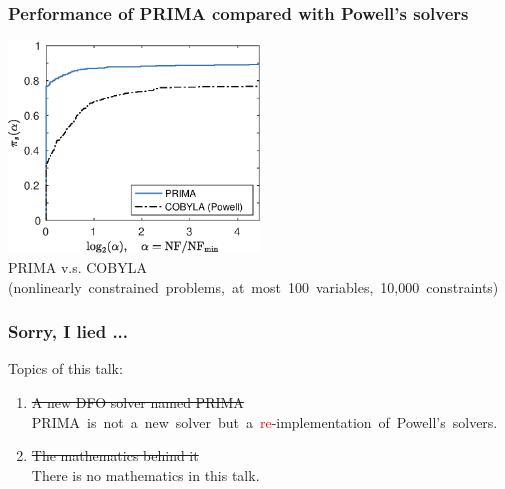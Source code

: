 \documentclass[slidestop,mathserif,xcolor=dvipsnames]{beamer}
\newcommand{\red}[1]{\textcolor{red}{#1}}
\begin{document}
\begin{frame}
    \frametitle{Performance of PRIMA compared with Powell's solvers}
    \vspace{3ex}
    \begin{center}
    \includegraphics[width=0.5\textwidth]{prima_cobyla.eps}
    \\[2ex]PRIMA v.s. COBYLA \\[1ex]\mbox{\!\!(nonlinearly constrained problems, at most 100 variables,
    10,000 constraints)}
    \end{center}
\end{frame}


\begin{frame}
    \frametitle{Sorry, I lied ...}

    \vspace{10ex}
    Topics of this talk:
    \vspace{2ex}
    \begin{enumerate}
        \item \st{A new DFO solver named PRIMA}
            \\[1ex] \mbox{PRIMA is not a new solver but a \red{re}-implementation of Powell's solvers.}%
            \vspace{2ex}
        \item \st{The mathematics behind it}
            \\[1ex]
            There is no mathematics in this talk.
    \end{enumerate}

    \vspace{2ex}
\end{frame}
\end{document}
